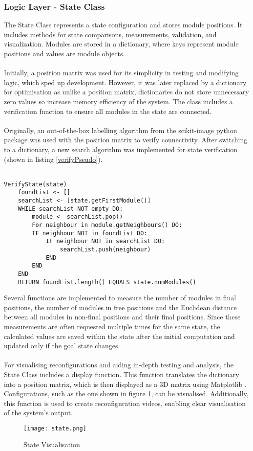 \subsubsection{Logic Layer - State Class}
The State Class represents a state configuration and stores module positions. It includes methods for state comparisons, measurements, validation, and visualization. Modules are stored in a dictionary, where keys represent module positions and values are module objects.
\\\\
Initially, a position matrix was used for its simplicity in testing and modifying logic, which sped up development. However, it was later replaced by a dictionary for optimisation as unlike a position matrix, dictionaries do not store unnecessary zero values so increase memory efficiency of the system.
The class includes a verification function to ensure all modules in the state are connected.
\\\\
Originally, an out-of-the-box labelling algorithm from the scikit-image python package \cite{scikit-image} was used with the position matrix to verify connectivity. After switching to a dictionary, a new search algorithm was implemented for state verification (shown in listing \ref{verifyPseudo}).
\\\\
\begin{lstlisting}[caption={State Verification Pseudo-code},captionpos=b,label={verifyPseudo}]
VerifyState(state)
	foundList <- []
	searchList <- [state.getFirstModule()]
	WHILE searchList NOT empty DO:
		module <- searchList.pop()
		For neighbour in module.getNeighbours() DO:
		IF neighbour NOT in foundList DO:
			IF neighbour NOT in searchList DO:
				searchList.push(neighbour)
			END
		END
	END
	RETURN foundList.length() EQUALS state.numModules()
\end{lstlisting}
Several functions are implemented to measure the number of modules in final positions, the number of modules in free positions and the Euclidean distance between all modules in non-final positions and their final positions. Since these measurements are often requested multiple times for the same state, the calculated values are saved within the state after the initial computation and updated only if the goal state changes.
\\\\
For visualising reconfigurations and aiding in-depth testing and analysis, the State Class includes a display function. This function translates the dictionary into a position matrix, which is then displayed as a 3D matrix using Matplotlib \cite{Hunter2007}. Configurations, such as the one shown in figure \ref{stateVisual}, can be visualised. Additionally, this function is used to create reconfiguration videos, enabling clear visualisation of the system's output.
\begin{figure}[H]
	\centering
	\texttt{[image: state.png]}
	\caption{State Visualisation}
	\label{stateVisual}
\end{figure}

